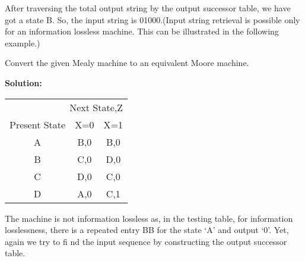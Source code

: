 \documentclass[a4,9pt]{beamer}
\begin{document}
\begin{frame}

After traversing the total output string by the output successor table, we have got a state B. So, the input string is 01000.(Input string retrieval is possible only for an information lossless machine. This can be illustrated in the following example.)

\pause
\vspace*{0.3cm}
 \hspace*{0.2cm} \footnotesize{Convert the given Mealy machine to an equivalent Moore machine.}

\vspace*{0.3cm}
\pause
\large{\textbf{Solution:}}
\vspace*{0.2cm}

\pause
\begin{center}
\begin{tabular}{ccc}
\hline

\hline

\hline

\hline
  \multicolumn{3}{r}{{Next State,Z}}\\
 \cline{2-3}
{Present State} & {X=0} & {X=1}\\
\hline
 A & B,0 & B,0 \\
 B & C,0 & D,0\\
 C & D,0 & C,0\\
 D & A,0 & C,1\\
\hline

\hline

\hline

\hline
\end{tabular}
\end{center}
\end{frame}

\begin{frame}
 The machine is not information lossless as, in the testing table, for information losslessness, there
is a repeated entry BB for the state ‘A’ and output ‘0’. Yet, again we try to fi nd the input sequence by
constructing the output successor table.
\end{frame}
\end{document}
